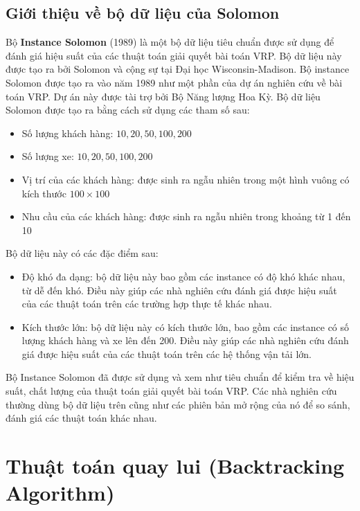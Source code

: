 \documentclass[12pt,a4paper]{article}\author{Nguyễn Nho Dũng}
\let\svsection\section
\def\section{\setcounter{figure}{0}\svsection}
\newcommand{\kniem}[1]{{\sffamily\bfseries #1}}
\begin{document}
\subsection{Giới thiệu về bộ dữ liệu của Solomon}
Bộ \kniem{Instance Solomon} (1989) là một bộ dữ liệu tiêu chuẩn được sử dụng để đánh giá hiệu suất của các thuật toán giải quyết bài toán VRP. Bộ dữ liệu này được tạo ra bởi Solomon và cộng sự tại Đại học Wisconsin-Madison. Bộ instance Solomon được tạo ra vào năm 1989 như một phần của dự án nghiên cứu về bài toán VRP. Dự án này được tài trợ bởi Bộ Năng lượng Hoa Kỳ. 
Bộ dữ liệu Solomon được tạo ra bằng cách sử dụng các tham số sau:
\begin{itemize}
	\item Số lượng khách hàng: $10, 20, 50, 100, 200$
	\item Số lượng xe: $10, 20, 50, 100, 200$
	\item Vị trí của các khách hàng: được sinh ra ngẫu nhiên trong một hình vuông có kích thước $100\times 100$
	\item Nhu cầu của các khách hàng: được sinh ra ngẫu nhiên trong khoảng từ 1 đến 10 
\end{itemize}
Bộ dữ liệu này có các đặc điểm sau:
\begin{itemize}
	\item Độ khó đa dạng: bộ dữ liệu này bao gồm các instance có độ khó khác nhau, từ dễ đến khó. Điều này giúp các nhà nghiên cứu đánh giá được hiệu suất của các thuật toán trên các trường hợp thực tế khác nhau. 
	\item Kích thước lớn: bộ dữ liệu này có kích thước lớn, bao gồm các instance có số lượng khách hàng và xe lên đến 200. Điều này giúp các nhà nghiên cứu đánh giá được hiệu suất của các thuật toán trên các hệ thống vận tải lớn. 
\end{itemize}
Bộ Instance Solomon đã được sử dụng và xem như tiêu chuẩn để kiểm tra về hiệu suất, chất lượng của thuật toán giải quyết bài toán VRP. Các nhà nghiên cứu thường dùng bộ dữ liệu trên cũng như các phiên bản mở rộng của nó để so sánh, đánh giá các thuật toán khác nhau. 
\newpage\section{Thuật toán quay lui (Backtracking Algorithm)}
\end{document}
